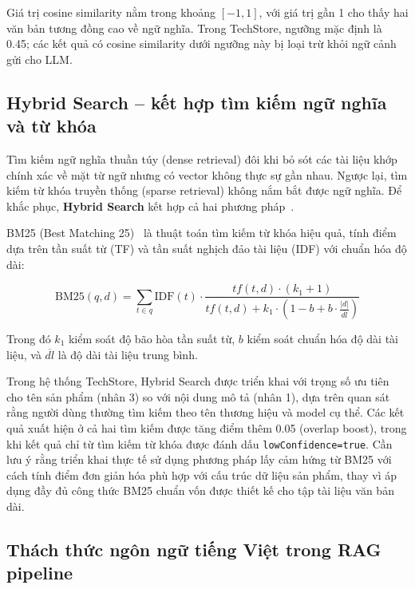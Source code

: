 Giá trị cosine similarity nằm trong khoảng $[-1, 1]$, với giá trị gần 1 cho thấy hai văn bản tương đồng cao về ngữ nghĩa. Trong TechStore, ngưỡng mặc định là 0.45; các kết quả có cosine similarity dưới ngưỡng này bị loại trừ khỏi ngữ cảnh gửi cho LLM.

\subsection{Hybrid Search -- kết hợp tìm kiếm ngữ nghĩa và từ khóa}
\label{sec:c2_hybrid_search}

Tìm kiếm ngữ nghĩa thuần túy (dense retrieval) đôi khi bỏ sót các tài liệu khớp chính xác về mặt từ ngữ nhưng có vector không thực sự gần nhau. Ngược lại, tìm kiếm từ khóa truyền thống (sparse retrieval) không nắm bắt được ngữ nghĩa. Để khắc phục, \textbf{Hybrid Search} kết hợp cả hai phương pháp~\cite{ma2021replication}.

BM25 (Best Matching 25)~\cite{robertson1994okapi} là thuật toán tìm kiếm từ khóa hiệu quả, tính điểm dựa trên tần suất từ (TF) và tần suất nghịch đảo tài liệu (IDF) với chuẩn hóa độ dài:

\begin{equation}
\text{BM25}(q, d) = \sum_{t \in q} \text{IDF}(t) \cdot \frac{tf(t,d) \cdot (k_1 + 1)}{tf(t,d) + k_1 \cdot \left(1 - b + b \cdot \frac{|d|}{\overline{dl}}\right)}
\label{eq:bm25}
\end{equation}

Trong đó $k_1$ kiểm soát độ bão hòa tần suất từ, $b$ kiểm soát chuẩn hóa độ dài tài liệu, và $\overline{dl}$ là độ dài tài liệu trung bình.

Trong hệ thống TechStore, Hybrid Search được triển khai với trọng số ưu tiên cho tên sản phẩm (nhân 3) so với nội dung mô tả (nhân 1), dựa trên quan sát rằng người dùng thường tìm kiếm theo tên thương hiệu và model cụ thể. Các kết quả xuất hiện ở cả hai tìm kiếm được tăng điểm thêm 0.05 (overlap boost), trong khi kết quả chỉ từ tìm kiếm từ khóa được đánh dấu \texttt{lowConfidence=true}. Cần lưu ý rằng triển khai thực tế sử dụng phương pháp lấy cảm hứng từ BM25 với cách tính điểm đơn giản hóa phù hợp với cấu trúc dữ liệu sản phẩm, thay vì áp dụng đầy đủ công thức BM25 chuẩn vốn được thiết kế cho tập tài liệu văn bản dài.

\subsection{Thách thức ngôn ngữ tiếng Việt trong RAG pipeline}
\label{sec:c2_vietnamese_nlp}

